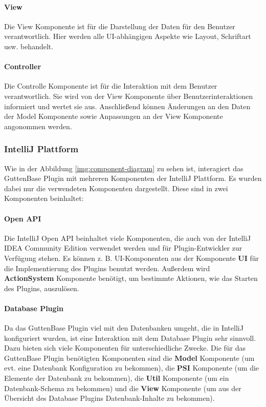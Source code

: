 \paragraph*{View}
	Die View Komponente ist für die Darstellung der Daten für den Benutzer verantwortlich. Hier werden alle UI-abhängigen Aspekte wie Layout, Schriftart usw. behandelt.\\
	
\paragraph*{Controller}
	Die Controlle Komponente ist für die Interaktion mit dem Benutzer verantwortlich. Sie wird von der View Komponente über Benutzerinteraktionen informiert und wertet sie aus. Anschließend können Änderungen an den Daten der Model Komponente sowie Anpassungen an der View Komponente angonommen werden.

\subsubsection{IntelliJ Plattform}
Wie in der Abbildung \ref{img:component-diagram} zu sehen ist, interagiert das GuttenBase Plugin mit mehreren Komponenten der IntelliJ Plattform. 
Es wurden dabei nur die verwendeten Komponenten dargestellt. Diese sind in zwei Komponenten beinhaltet:

\paragraph*{Open API}
Die IntelliJ Open API beinhaltet viele Komponenten, die auch von der IntelliJ IDEA Community Edition verwendet werden und für Plugin-Entwickler zur Verfügung stehen. Es können z. B. UI-Komponenten aus der Komponente \textbf{UI} für die Implementierung des Plugins benutzt werden. Außerdem wird \textbf{ActionSystem} Komponente benötigt, um bestimmte Aktionen, wie das Starten des Plugins, auszulösen.
\paragraph*{Database Plugin}
Da das GuttenBase Plugin viel mit den Datenbanken umgeht, die in IntelliJ konfiguriert wurden, ist eine Interaktion mit dem Database Plugin sehr sinnvoll. Dazu bieten sich viele Komponenten für unterschiedliche Zwecke. Die für das GuttenBase Plugin benötigten Komponenten sind die \textbf{Model} Komponente (um evt. eine Datenbank Konfiguration zu bekommen), die \textbf{PSI} Komponente (um die Elemente der Datenbank zu bekommen), die \textbf{Util} Komponente (um ein Datenbank-Schema zu bekommen) und die \textbf{View} Komponente (um aus der Übersicht des Database  Plugins Datenbank-Inhalte zu bekommen).


